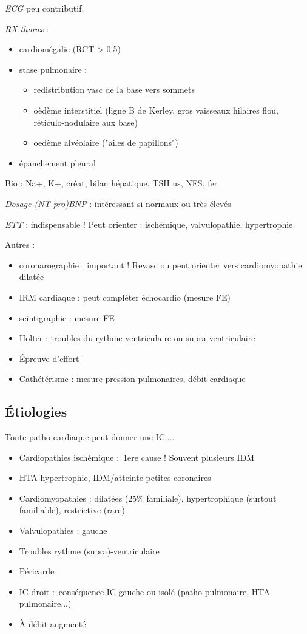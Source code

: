 \documentclass{article}
\begin{document}
\textit{ECG}  peu contributif.

\textit{RX thorax}  :
\begin{itemize}
  \item cardiomégalie (\gls{RCT} > 0.5)
  \item stase pulmonaire :
    \begin{itemize}
      \item redistribution vasc de la base vers sommets
      \item oèdème interstitiel (ligne B de Kerley, gros vaisseaux hilaires flou,
        réticulo-nodulaire aux base)
      \item oedème alvéolaire ("ailes de papillons")
    \end{itemize}
  \item épanchement pleural
\end{itemize}

Bio : Na+, K+, créat, bilan hépatique, TSH us, NFS, fer

\textit{Dosage (NT-pro)BNP}  : intéressant si normaux ou très élevés

\textit{ETT} : indispensable ! Peut orienter : ischémique, valvulopathie,
hypertrophie

Autres :
\begin{itemize}
  \item coronarographie : important ! Revasc ou peut orienter vers cardiomyopathie
    dilatée
  \item IRM cardiaque : peut compléter échocardio (mesure \gls{FE})
  \item scintigraphie : mesure FE
  \item Holter : troubles du rythme ventriculaire ou supra-ventriculaire
  \item Épreuve d'effort
  \item Cathétérisme : mesure pression pulmonaires, débit cardiaque
\end{itemize}

\subsection{Étiologies}
Toute patho cardiaque peut donner une IC....

\begin{itemize}
  \item Cardiopathies ischémique : 1ere cause ! Souvent plusieurs IDM
  \item HTA \thus hypertrophie, IDM/atteinte petites coronaires
  \item Cardiomyopathies : dilatées (25\% familiale), hypertrophique (surtout
    familiable), restrictive (rare)
  \item Valvulopathies : gauche
  \item Troubles rythme (supra)-ventriculaire
  \item Péricarde
  \item IC droit : conséquence IC gauche ou isolé (patho pulmonaire, HTA
    pulmonaire...)
  \item À débit augmenté
\end{itemize}
\end{document}

